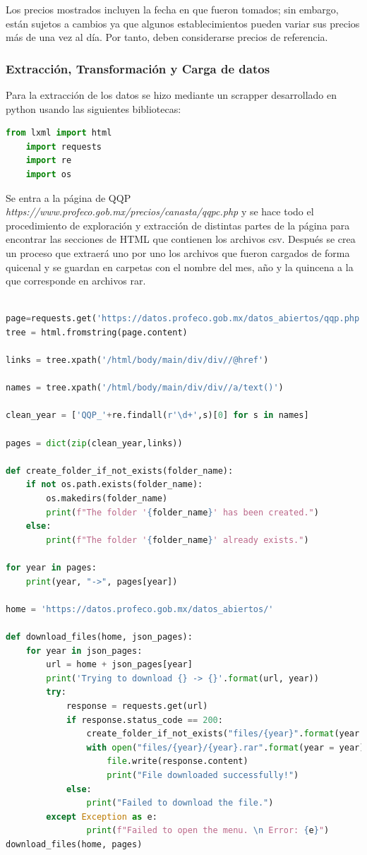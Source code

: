 \documentclass{article}
\begin{document}
Los precios mostrados incluyen la fecha en que fueron tomados; sin embargo, están sujetos a cambios ya que algunos establecimientos pueden variar sus precios más de una vez al día. Por tanto, deben considerarse precios de referencia.

\subsubsection{Extracción, Transformación y Carga de datos}

Para la extracción de los datos se hizo mediante un scrapper desarrollado en python usando las siguientes bibliotecas:
\begin{lstlisting}[language=Python]
    from lxml import html
    import requests
    import re
    import os
\end{lstlisting}

Se entra a la página de QQP \textit{https://www.profeco.gob.mx/precios/canasta/qqpc.php} y se hace todo el procedimiento de exploración y extracción de distintas partes de la página para encontrar las secciones de HTML que contienen los archivos csv. Después se crea un proceso que extraerá uno por uno los archivos que fueron cargados de forma quicenal y se guardan en carpetas con el nombre del mes, año y la quincena a la que corresponde en archivos rar. 

\begin{lstlisting}[language=Python, caption={python version}]

page=requests.get('https://datos.profeco.gob.mx/datos_abiertos/qqp.php')
tree = html.fromstring(page.content)

links = tree.xpath('/html/body/main/div/div//@href')

names = tree.xpath('/html/body/main/div/div//a/text()')

clean_year = ['QQP_'+re.findall(r'\d+',s)[0] for s in names]

pages = dict(zip(clean_year,links))

def create_folder_if_not_exists(folder_name):
    if not os.path.exists(folder_name):
        os.makedirs(folder_name)
        print(f"The folder '{folder_name}' has been created.")
    else:
        print(f"The folder '{folder_name}' already exists.")

for year in pages:
    print(year, "->", pages[year])

home = 'https://datos.profeco.gob.mx/datos_abiertos/'

def download_files(home, json_pages):
    for year in json_pages:
        url = home + json_pages[year]
        print('Trying to download {} -> {}'.format(url, year))
        try:
            response = requests.get(url)
            if response.status_code == 200:
                create_folder_if_not_exists("files/{year}".format(year = year))
                with open("files/{year}/{year}.rar".format(year = year), "wb") as file:
                    file.write(response.content)
                    print("File downloaded successfully!")
            else:
                print("Failed to download the file.")
        except Exception as e:
                print(f"Failed to open the menu. \n Error: {e}")
download_files(home, pages)
\end{lstlisting}
\end{document}
